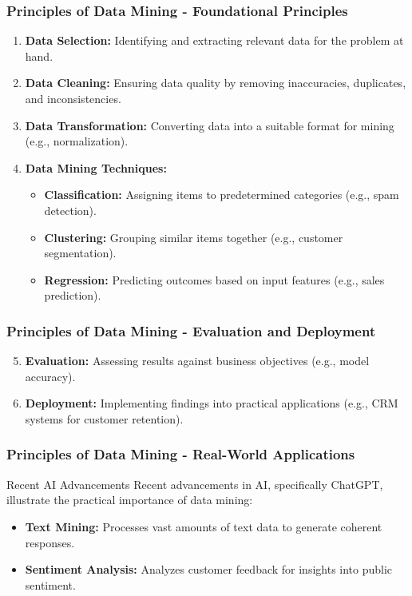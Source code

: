 \documentclass[aspectratio=169]{beamer}
\begin{document}
\begin{frame}[fragile]
    \frametitle{Principles of Data Mining - Foundational Principles}
    \begin{enumerate}
        \item \textbf{Data Selection:} Identifying and extracting relevant data for the problem at hand.
        \item \textbf{Data Cleaning:} Ensuring data quality by removing inaccuracies, duplicates, and inconsistencies.
        \item \textbf{Data Transformation:} Converting data into a suitable format for mining (e.g., normalization).
        \item \textbf{Data Mining Techniques:}
            \begin{itemize}
                \item \textbf{Classification:} Assigning items to predetermined categories (e.g., spam detection).
                \item \textbf{Clustering:} Grouping similar items together (e.g., customer segmentation).
                \item \textbf{Regression:} Predicting outcomes based on input features (e.g., sales prediction).
            \end{itemize}
    \end{enumerate}
\end{frame}

\begin{frame}[fragile]
    \frametitle{Principles of Data Mining - Evaluation and Deployment}
    \begin{enumerate}
        \setcounter{enumi}{4}
        \item \textbf{Evaluation:} Assessing results against business objectives (e.g., model accuracy).
        \item \textbf{Deployment:} Implementing findings into practical applications (e.g., CRM systems for customer retention).
    \end{enumerate}
\end{frame}

\begin{frame}[fragile]
    \frametitle{Principles of Data Mining - Real-World Applications}
    \begin{block}{Recent AI Advancements}
        Recent advancements in AI, specifically ChatGPT, illustrate the practical importance of data mining:
    \end{block}
    \begin{itemize}
        \item \textbf{Text Mining:} Processes vast amounts of text data to generate coherent responses.
        \item \textbf{Sentiment Analysis:} Analyzes customer feedback for insights into public sentiment.
    \end{itemize}
\end{frame}
\end{document}
